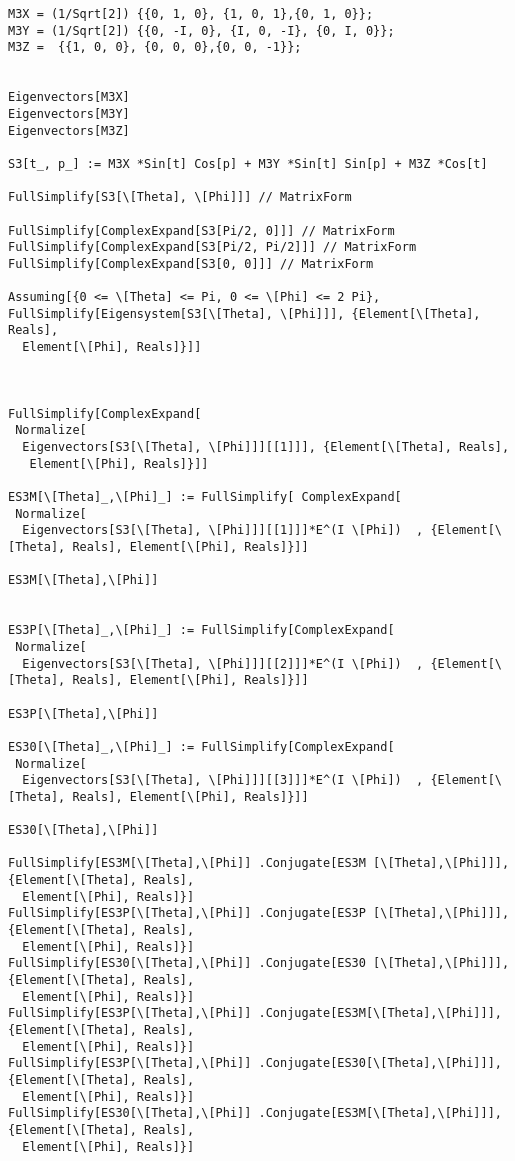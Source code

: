 \documentclass[%
 showpacs,
 showkeys,
 preprintnumbers,
 amsmath,amssymb,
 aps,
  pra,
  longbibliography,
 floatfix,
 ]{revtex4-1}
\begin{document}
{\begin{lstlisting}[backgroundcolor=\color{yellow!10},framerule=0pt,breaklines=true, frame=tb]
M3X = (1/Sqrt[2]) {{0, 1, 0}, {1, 0, 1},{0, 1, 0}};
M3Y = (1/Sqrt[2]) {{0, -I, 0}, {I, 0, -I}, {0, I, 0}};
M3Z =  {{1, 0, 0}, {0, 0, 0},{0, 0, -1}};


Eigenvectors[M3X]
Eigenvectors[M3Y]
Eigenvectors[M3Z]

S3[t_, p_] := M3X *Sin[t] Cos[p] + M3Y *Sin[t] Sin[p] + M3Z *Cos[t]

FullSimplify[S3[\[Theta], \[Phi]]] // MatrixForm

FullSimplify[ComplexExpand[S3[Pi/2, 0]]] // MatrixForm
FullSimplify[ComplexExpand[S3[Pi/2, Pi/2]]] // MatrixForm
FullSimplify[ComplexExpand[S3[0, 0]]] // MatrixForm

Assuming[{0 <= \[Theta] <= Pi, 0 <= \[Phi] <= 2 Pi}, FullSimplify[Eigensystem[S3[\[Theta], \[Phi]]], {Element[\[Theta], Reals],
  Element[\[Phi], Reals]}]]



FullSimplify[ComplexExpand[
 Normalize[
  Eigenvectors[S3[\[Theta], \[Phi]]][[1]]], {Element[\[Theta], Reals],
   Element[\[Phi], Reals]}]]

ES3M[\[Theta]_,\[Phi]_] := FullSimplify[ ComplexExpand[
 Normalize[
  Eigenvectors[S3[\[Theta], \[Phi]]][[1]]]*E^(I \[Phi])  , {Element[\[Theta], Reals], Element[\[Phi], Reals]}]]

ES3M[\[Theta],\[Phi]]


ES3P[\[Theta]_,\[Phi]_] := FullSimplify[ComplexExpand[
 Normalize[
  Eigenvectors[S3[\[Theta], \[Phi]]][[2]]]*E^(I \[Phi])  , {Element[\[Theta], Reals], Element[\[Phi], Reals]}]]

ES3P[\[Theta],\[Phi]]

ES30[\[Theta]_,\[Phi]_] := FullSimplify[ComplexExpand[
 Normalize[
  Eigenvectors[S3[\[Theta], \[Phi]]][[3]]]*E^(I \[Phi])  , {Element[\[Theta], Reals], Element[\[Phi], Reals]}]]

ES30[\[Theta],\[Phi]]

FullSimplify[ES3M[\[Theta],\[Phi]] .Conjugate[ES3M [\[Theta],\[Phi]]], {Element[\[Theta], Reals],
  Element[\[Phi], Reals]}]
FullSimplify[ES3P[\[Theta],\[Phi]] .Conjugate[ES3P [\[Theta],\[Phi]]], {Element[\[Theta], Reals],
  Element[\[Phi], Reals]}]
FullSimplify[ES30[\[Theta],\[Phi]] .Conjugate[ES30 [\[Theta],\[Phi]]], {Element[\[Theta], Reals],
  Element[\[Phi], Reals]}]
FullSimplify[ES3P[\[Theta],\[Phi]] .Conjugate[ES3M[\[Theta],\[Phi]]], {Element[\[Theta], Reals],
  Element[\[Phi], Reals]}]
FullSimplify[ES3P[\[Theta],\[Phi]] .Conjugate[ES30[\[Theta],\[Phi]]], {Element[\[Theta], Reals],
  Element[\[Phi], Reals]}]
FullSimplify[ES30[\[Theta],\[Phi]] .Conjugate[ES3M[\[Theta],\[Phi]]], {Element[\[Theta], Reals],
  Element[\[Phi], Reals]}]



\end{lstlisting}}
\end{document}
